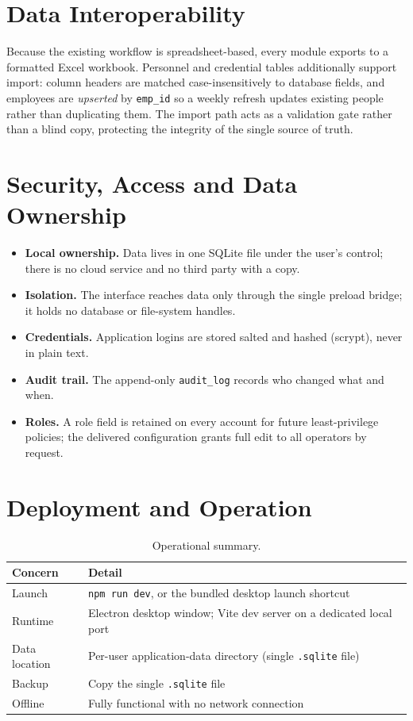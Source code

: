 \documentclass[11pt]{article}
\begin{document}
\section{Data Interoperability}
Because the existing workflow is spreadsheet-based, every module exports to a formatted Excel workbook.
Personnel and credential tables additionally support import: column headers are matched
case-insensitively to database fields, and employees are \emph{upserted} by \texttt{emp\_id} so a weekly
refresh updates existing people rather than duplicating them. The import path acts as a validation
gate rather than a blind copy, protecting the integrity of the single source of truth.

\section{Security, Access and Data Ownership}
\begin{itemize}
  \item \textbf{Local ownership.} Data lives in one SQLite file under the user's control; there is no
        cloud service and no third party with a copy.
  \item \textbf{Isolation.} The interface reaches data only through the single preload bridge; it holds
        no database or file-system handles.
  \item \textbf{Credentials.} Application logins are stored salted and hashed (scrypt), never in plain text.
  \item \textbf{Audit trail.} The append-only \texttt{audit\_log} records who changed what and when.
  \item \textbf{Roles.} A role field is retained on every account for future least-privilege policies;
        the delivered configuration grants full edit to all operators by request.
\end{itemize}

\section{Deployment and Operation}
\begin{table}[H]
\centering\small
\begin{tabular}{@{}l l@{}}
\toprule
\textbf{Concern} & \textbf{Detail} \\
\midrule
Launch          & \texttt{npm run dev}, or the bundled desktop launch shortcut \\
Runtime         & Electron desktop window; Vite dev server on a dedicated local port \\
Data location   & Per-user application-data directory (single \texttt{.sqlite} file) \\
Backup          & Copy the single \texttt{.sqlite} file \\
Offline         & Fully functional with no network connection \\
\bottomrule
\end{tabular}
\caption{Operational summary.}
\end{table}
\end{document}
